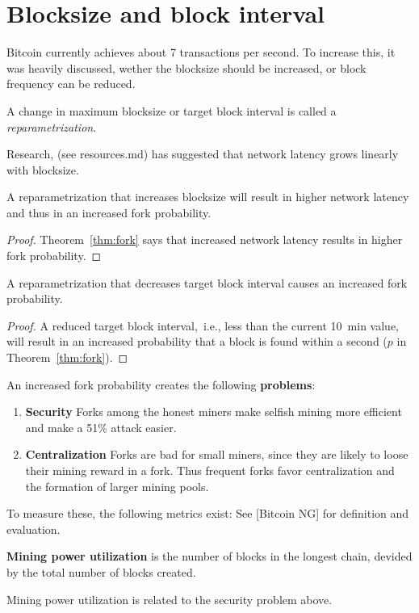 
\section{Blocksize and block interval}
Bitcoin currently achieves about 7 transactions per second. 
To increase this, it was heavily discussed, wether the blocksize should be increased, or block frequency can be reduced.

\begin{definition} A change in maximum blocksize or target block interval is called a \emph{reparametrization}.
\end{definition}

Research, (see resources.md) has suggested that network latency grows linearly with blocksize.
\begin{lem} 
	A reparametrization that increases blocksize will result in higher network latency and thus in an increased fork probability.
\end{lem}
\begin{proof}
Theorem~\ref{thm:fork} says that increased network latency results in higher fork probability.	
\end{proof}

\begin{lem}
	A reparametrization that decreases target block interval causes an increased fork probability.
\end{lem}
\begin{proof}
A reduced target block interval,~i.e., less than the current 10~min value, will result in an increased probability that a block is found within a second ($p$ in Theorem~\ref{thm:fork}).
\end{proof}

An increased fork probability creates the following \textbf{problems}:
\begin{enumerate}
	\item \textbf{Security} Forks among the honest miners make selfish mining more efficient and make a 51\% attack easier. 
	\item \textbf{Centralization} Forks are bad for small miners, since they are likely to loose their mining reward in a fork. Thus frequent forks favor centralization and the formation of larger mining pools.
\end{enumerate}

To measure these, the following metrics exist: See [Bitcoin NG] for definition and evaluation.
\begin{definition}
\textbf{Mining power utilization} is the number of blocks in the longest chain, devided by the total number of blocks created. 
\end{definition}
Mining power utilization is related to the security problem above.

